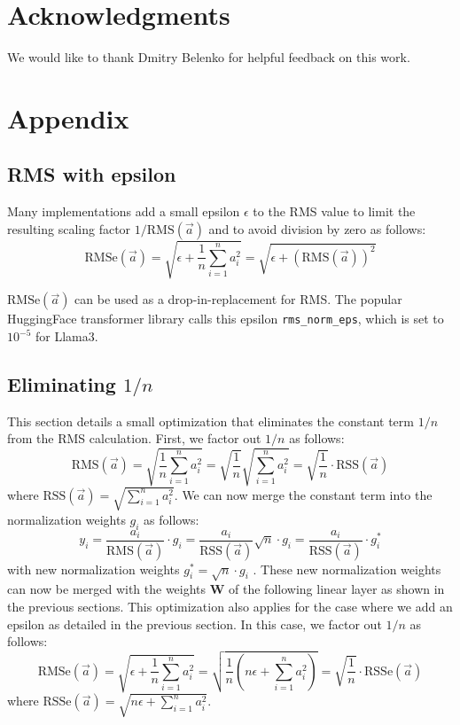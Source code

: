 \documentclass{article}
\numberwithin{equation}{section} %
\newcommand{\mat}[1]{\mathbf{#1}}     %
\def\rms{\text{RMS}(\vec{a})}         %
\def\f1n{\frac{1}{n}}                 %
\def\sas{\sum_{i=1}^n a_i^2}          %
\def\a{\vec{a}}                       %
\begin{document}
\section*{Acknowledgments}
We would like to thank Dmitry Belenko for helpful feedback on this work.

\section*{Appendix}

\subsection*{RMS with epsilon}
Many implementations add a small epsilon $\epsilon$ to the RMS value to limit the resulting scaling factor $1/\rms$ and to avoid division by zero as follows:
\begin{equation*}
 \text{RMSe}(\a) = \sqrt{\epsilon + \f1n \sas} = \sqrt{\epsilon + \left( \rms \right)^2}
\end{equation*}

$\text{RMSe}(\a)$ can be used as a drop-in-replacement for RMS. The popular HuggingFace transformer library calls this epsilon \verb+rms_norm_eps+, which is set to $10^{-5}$ for Llama3.

\subsection*{Eliminating $1/n$}
This section details a small optimization that eliminates the constant term $1/n$ from the RMS calculation. First, we factor out $1/n$ as follows:
\begin{equation*}
  \rms = \sqrt{\f1n \sas} = \sqrt{\f1n} \sqrt{\sas} = \sqrt{\f1n} \cdot \text{RSS}(\a)
\end{equation*}
where $\text{RSS}(\a) = \sqrt{\sas}$. We can now merge the constant term into the normalization weights $g_i$ as follows:
\begin{equation*}
  y_i = \frac{a_i}{\rms} \cdot g_i =
  \frac{a_i}{\text{RSS}(\a)} \sqrt{n} \cdot g_i =
  \frac{a_i}{\text{RSS}(\a)}          \cdot g_i^\ast
\end{equation*}
with new normalization weights $g_i^\ast = \sqrt{n} \cdot g_i$ . These new normalization weights can now be merged with the weights $\mat{W}$ of the following linear layer as shown in the previous sections. This optimization also applies for the case where we add an epsilon as detailed in the previous section. In this case, we factor out $1/n$ as follows:
\begin{equation*}
  \text{RMSe}(\a) = \sqrt{\epsilon + \f1n \sas}
  = \sqrt{\f1n \left( n \epsilon + \sas \right)}
  = \sqrt{\f1n} \cdot \text{RSSe}(\a)
\end{equation*}
where $\text{RSSe}(\a) = \sqrt{n \epsilon + \sas}$.



\end{document}
